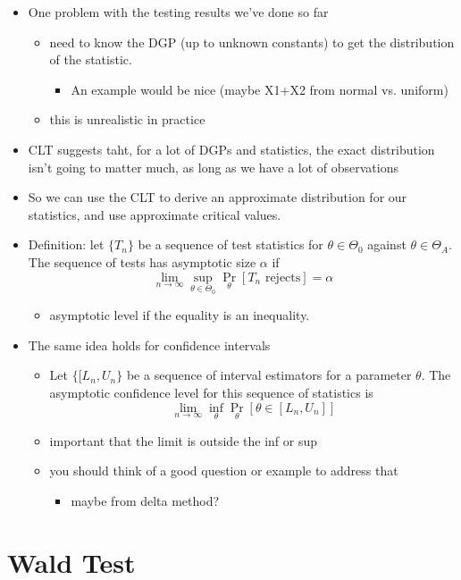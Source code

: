 \begin{itemize}
\item One problem with the testing results we've done so far
\begin{itemize}
\item need to know the DGP (up to unknown constants) to get the
        distribution of the statistic.
\begin{itemize}
\item An example would be nice (maybe X1+X2 from normal vs. uniform)
\end{itemize}
\item this is unrealistic in practice
\end{itemize}
\item CLT suggests taht, for a lot of DGPs and statistics, the exact
      distribution isn't going to matter much, as long as we have a
      lot of observations
\item So we can use the CLT to derive an approximate distribution for
      our statistics, and use approximate critical values.
\item Definition: let $\{T_n\}$ be a sequence of test statistics for
      $\theta \in \Theta_0$ against $\theta \in \Theta_A$.  The
      sequence of tests has asymptotic size $\alpha$ if 
      \[\lim_{n \to \infty} \sup_{\theta \in \Theta_0} \Pr_\theta[T_n \text{ rejects}] = \alpha\]
\begin{itemize}
\item asymptotic level if the equality is an inequality.
\end{itemize}
\item The same idea holds for confidence intervals
\begin{itemize}
\item Let $\{[L_n, U_n\}$ be a sequence of interval estimators for a
        parameter $\theta$.  The asymptotic confidence level for this
        sequence of statistics is
        \[\lim_{n\to\infty} \inf_\theta \Pr_{\theta}[\theta \in [L_n, U_n]]\]
\item important that the limit is outside the inf or sup
\item you should think of a good question or example to address that
\begin{itemize}
\item maybe from delta method?
\end{itemize}
\end{itemize}
\end{itemize}
\section{Wald Test}
\label{sec-2}

